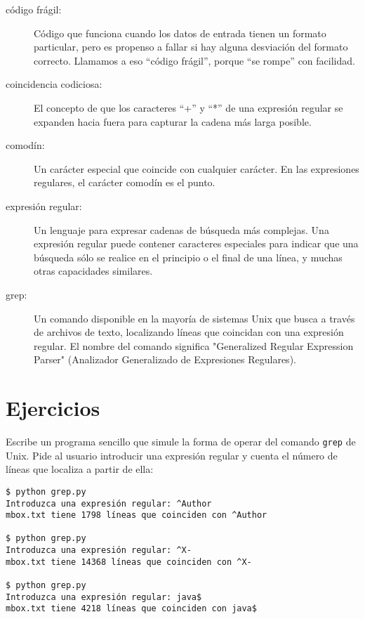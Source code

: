 \begin{description}

\item[código frágil:]
Código que funciona cuando los datos de entrada tienen un formato particular, pero es propenso a fallar
si hay alguna desviación del formato correcto. Llamamos a eso ``código frágil'',
porque ``se rompe'' con facilidad.

\item[coincidencia codiciosa:]
El concepto de que los caracteres ``+'' y ``*'' de una expresión regular se expanden hacia fuera para
capturar la cadena más larga posible.

\item[comodín:]
Un carácter especial que coincide con cualquier carácter. En las expresiones regulares, el carácter
comodín es el punto.

\item[expresión regular:]
Un lenguaje para expresar cadenas de búsqueda más complejas. Una expresión regular puede contener
caracteres especiales para indicar que una búsqueda sólo se realice en el principio o el final de una línea,
y muchas otras capacidades similares.

\item[grep:]
Un comando disponible en la mayoría de sistemas Unix que busca a través de archivos de texto, localizando líneas
que coincidan con una expresión regular. El nombre del comando significa "Generalized Regular Expression Parser"
(Analizador Generalizado de Expresiones Regulares).

\end{description}

\section{Ejercicios}

\begin{ex}
Escribe un programa sencillo que simule la forma de operar del comando {\tt grep}
de Unix. Pide al usuario introducir una expresión regular y cuenta el número
de líneas que localiza a partir de ella:

\beforeverb
\begin{verbatim}
$ python grep.py
Introduzca una expresión regular: ^Author
mbox.txt tiene 1798 líneas que coinciden con ^Author

$ python grep.py
Introduzca una expresión regular: ^X-
mbox.txt tiene 14368 líneas que coinciden con ^X-

$ python grep.py
Introduzca una expresión regular: java$
mbox.txt tiene 4218 líneas que coinciden con java$
\end{verbatim}
\afterverb
%
\end{ex}

